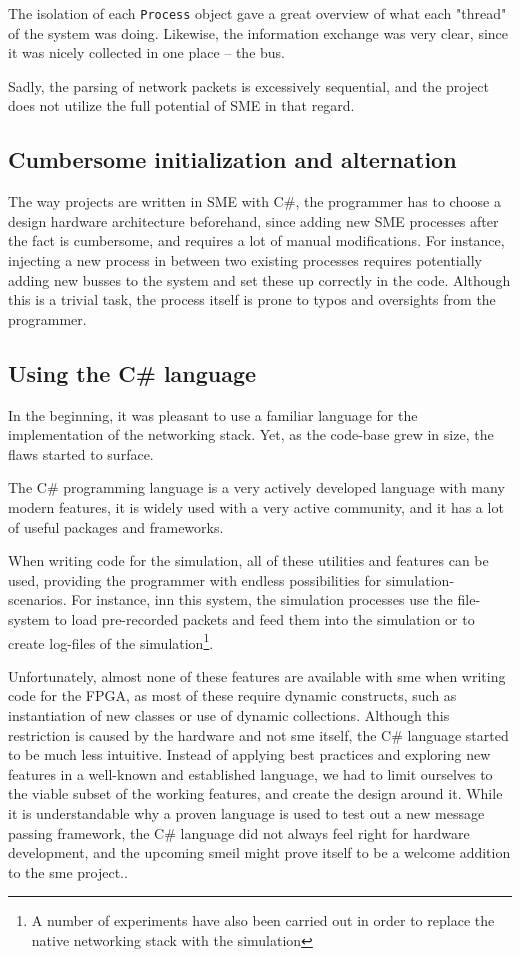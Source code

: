 The isolation of each \texttt{Process} object gave a great overview of what each
"thread" of the system was doing. Likewise, the information exchange was very
clear, since it was nicely collected in one place -- the bus.

Sadly, the parsing of network packets is excessively sequential, and the
project does not utilize the full potential of SME in that regard.

\subsection{Cumbersome initialization and alternation}
The way projects are written in SME with C\#, the programmer has to
choose a design hardware architecture beforehand, since adding new SME
processes after the fact is cumbersome, and requires a lot of manual
modifications.
For instance, injecting a new process in between two existing processes
requires potentially adding new busses to the system and set these up correctly
in the code. Although this is a trivial task, the process itself is prone to
typos and oversights from the programmer.


\subsection{Using the C\# language}
In the beginning, it was pleasant to use a familiar language for the
implementation of the networking stack. Yet, as the code-base grew in size, the
flaws started to surface.

The C\# programming language is a very actively developed language with many
modern features, it is widely used with a very active community, and it has a lot
of useful packages and frameworks.

When writing code for the simulation, all of these utilities and features can
be used, providing the programmer with endless possibilities for
simulation-scenarios. For instance, inn this system, the simulation processes use the
file-system to load pre-recorded packets and feed them into the
simulation or to create log-files of the simulation\footnote{
A number of experiments have also been carried out in order to replace the
native networking stack with the simulation}.

Unfortunately, almost none of these features are available with \gls{sme}
when writing code for the FPGA, as most of these require dynamic constructs,
such as instantiation of new classes or use of dynamic collections. Although
this restriction is caused by the hardware and not \gls{sme} itself,
the C\# language started to be much less intuitive. Instead of applying
best practices and exploring new features in a well-known and established
language, we had to limit ourselves to the viable subset of the working
features, and create the design around it. While it is understandable why
a proven language is used to test out a new message passing framework,
the C\# language did not always feel right for hardware development, and
the upcoming \gls{smeil} might prove itself to be a welcome addition to
the \gls{sme} project.\cite{github_smeil}.


